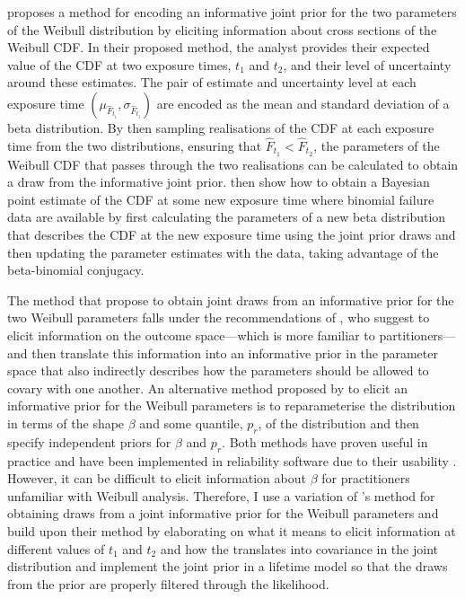 \citet{kaminskiy2005} proposes a method for encoding an informative joint prior for the two parameters of the Weibull distribution by eliciting information about cross sections of the Weibull CDF. In their proposed method, the analyst provides their expected value of the CDF at two exposure times, $t_1$ and $t_2$, and their level of uncertainty around these estimates. The pair of estimate and uncertainty level at each exposure time $(\mu_{\hat{F}_{t_i}}, \sigma_{\hat{F}_{t_i}})$ are encoded as the mean and standard deviation of a beta distribution. By then sampling realisations of the CDF at each exposure time from the two distributions, ensuring that $\hat{F}_{t_1} < \hat{F}_{t_2}$, the parameters of the Weibull CDF that passes through the two realisations can be calculated to obtain a draw from the informative joint prior. \citeauthor{kaminskiy2005} then show how to obtain a Bayesian point estimate of the CDF at some new exposure time where binomial failure data are available by first calculating the parameters of a new beta distribution that describes the CDF at the new exposure time using the joint prior draws and then updating the parameter estimates with the data, taking advantage of the beta-binomial conjugacy.

The method that \citeauthor{kaminskiy2005} propose to obtain joint draws from an informative prior for the two Weibull parameters falls under the recommendations of \citet{gelman_workflow_2020}, who suggest to elicit information on the outcome space---which is more familiar to partitioners---and then translate this information into an informative prior in the parameter space that also indirectly describes how the parameters should be allowed to covary with one another. An alternative method proposed by \citet{Meeker2022} to elicit an informative prior for the Weibull parameters is to reparameterise the distribution in terms of the shape $\beta$ and some quantile, $p_r$, of the distribution and then specify independent priors for $\beta$ and $p_r$. Both methods have proven useful in practice and have been implemented in reliability software due to their usability \citep{krivtsov2017}. However, it can be difficult to elicit information about $\beta$ for practitioners unfamiliar with Weibull analysis. Therefore, I use a variation of \citeauthor{kaminskiy2005}'s method for obtaining draws from a joint informative prior for the Weibull parameters and build upon their method by elaborating on what it means to elicit information at different values of $t_1$ and $t_2$ and how the translates into covariance in the joint distribution and implement the joint prior in a lifetime model so that the draws from the prior are properly filtered through the likelihood.

